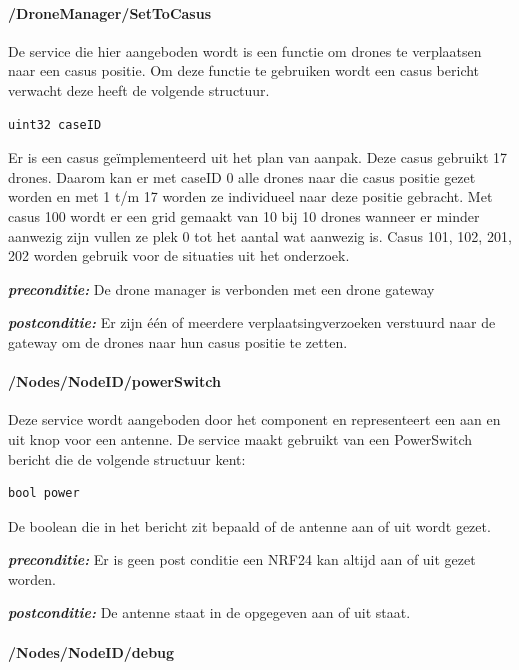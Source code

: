 \documentclass[a4paper, 11pt, oneside]{report}
\begin{document}
\paragraph{/DroneManager/SetToCasus}
\label{DetailedDesign:ros:extern:rosinterfaces:service:casus}
De service die hier aangeboden wordt is een functie om drones te verplaatsen naar een casus positie.
Om deze functie te gebruiken wordt een casus bericht verwacht deze heeft de volgende structuur.

\begin{lstlisting}
uint32 caseID
\end{lstlisting}

Er is een casus geïmplementeerd uit het plan van aanpak.
Deze casus gebruikt 17 drones. 
Daarom kan er met caseID 0 alle drones naar die casus positie gezet worden en met 1 t/m 17 worden ze individueel naar deze positie gebracht.
Met casus 100 wordt er een grid gemaakt van 10 bij 10 drones wanneer er minder aanwezig zijn vullen ze plek 0 tot het aantal wat aanwezig is.
Casus 101, 102, 201, 202 worden gebruik voor de situaties uit het onderzoek.   

\textbf{\textit{preconditie:}}  De drone manager is verbonden met een drone gateway 

\textbf{\textit{postconditie:}} Er zijn één of meerdere verplaatsingverzoeken verstuurd naar de gateway om de drones naar hun casus positie te zetten.

\paragraph{/Nodes/NodeID/powerSwitch}
\label{DetailedDesign:ros:extern:rosinterfaces:service:powerswitch}
Deze service wordt aangeboden door het component  en representeert een aan en uit knop voor een antenne.
De service maakt gebruikt van een PowerSwitch bericht die de volgende structuur kent:

\begin{lstlisting}
bool power
\end{lstlisting}

De boolean die in het bericht zit bepaald of de antenne aan of uit wordt gezet.

\textbf{\textit{preconditie:}}  Er is geen post conditie een NRF24 kan altijd aan of uit gezet worden.

\textbf{\textit{postconditie:}} De antenne staat in de opgegeven aan of uit staat.

\paragraph{/Nodes/NodeID/debug}
\label{DetailedDesign:ros:extern:rosinterfaces:topic:debug}
\end{document}
